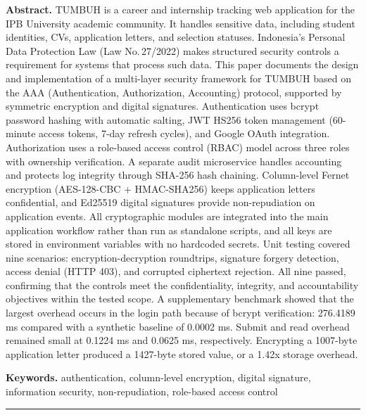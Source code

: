 \documentclass[12pt,a4paper]{article}
\begin{document}
\noindent\textbf{Abstract.} TUMBUH is a career and internship tracking
web application for the IPB University academic community. It handles
sensitive data, including student identities, CVs, application letters,
and selection statuses. Indonesia's Personal Data Protection Law
(Law No.\,27/2022) makes structured security controls a requirement
for systems that process such data. This paper documents the design and
implementation of a multi-layer security framework for TUMBUH based on
the AAA (Authentication, Authorization, Accounting) protocol, supported
by symmetric encryption and digital signatures. Authentication uses
bcrypt password hashing with automatic salting, JWT HS256 token
management (60-minute access tokens, 7-day refresh cycles), and Google
OAuth integration. Authorization uses a role-based access control
(RBAC) model across three roles with ownership verification. A separate
audit microservice handles accounting and protects log integrity through
SHA-256 hash chaining. Column-level Fernet encryption (AES-128-CBC +
HMAC-SHA256) keeps application letters confidential, and Ed25519
digital signatures provide non-repudiation on application events. All
cryptographic modules are integrated into the main application workflow
rather than run as standalone scripts, and all keys are stored in
environment variables with no hardcoded secrets. Unit testing covered
nine scenarios: encryption-decryption roundtrips, signature forgery
detection, access denial (HTTP 403), and corrupted ciphertext
rejection. All nine passed, confirming that the controls meet the
confidentiality, integrity, and accountability objectives within the
tested scope. A supplementary benchmark showed that the largest
overhead occurs in the login path because of bcrypt verification:
276.4189 ms compared with a synthetic baseline of 0.0002 ms. Submit
and read overhead remained small at 0.1224 ms and 0.0625 ms,
respectively. Encrypting a 1007-byte application letter produced a
1427-byte stored value, or a 1.42x storage overhead.

\vspace{4pt}
\noindent\textbf{Keywords.} authentication, column-level encryption,
digital signature, information security, non-repudiation, role-based
access control

\vspace{6pt}\noindent\rule{\textwidth}{0.4pt}\vspace{4pt}

\end{document}
